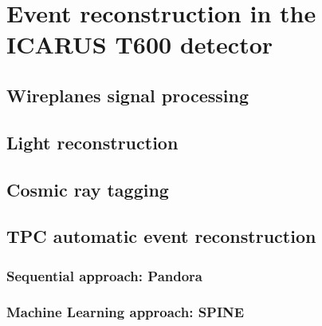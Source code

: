 
\chapter{Event reconstruction in the ICARUS T600 detector}
\label{chap:event_reconstruction}



\section{Wireplanes signal processing}

\section{Light reconstruction}

\section{Cosmic ray tagging}

\section{TPC automatic event reconstruction}

\subsection{Sequential approach: Pandora}

\subsection{Machine Learning approach: SPINE}